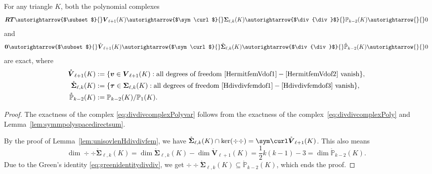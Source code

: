 \begin{lemma}
For any triangle $K$, both the polynomial complexes
\begin{equation}\label{eq:divdivcomplexPolyvar}
\boldsymbol  {RT}\autorightarrow{$\subset$}{} \boldsymbol V_{\ell+1}(K)\autorightarrow{$\sym\curl$}{} \boldsymbol \Sigma_{\ell,k}(K) \autorightarrow{$\div{\div}$}{} \mathbb P_{k-2}(K)\autorightarrow{}{}0
\end{equation}
and
\begin{equation}\label{eq:divdivcomplexPolyvar0}
\boldsymbol 0\autorightarrow{$\subset$}{} \mathring{\boldsymbol V}_{\ell+1}(K)\autorightarrow{$\sym\curl$}{} \mathring{\boldsymbol \Sigma}_{\ell,k}(K) \autorightarrow{$\div{\div}$}{} \mathring{\mathbb P}_{k-2}(K)\autorightarrow{}{}0
\end{equation}
are exact, where
\begin{align*}
\mathring{\boldsymbol V}_{\ell+1}(K)&:=\{\boldsymbol  v\in\boldsymbol V_{\ell+1}(K): \textrm{all degrees of freedom } \eqref{HermitfemVdof1}-\eqref{HermitfemVdof2} \textrm{ vanish}\},
\\
\mathring{\boldsymbol \Sigma}_{\ell,k}(K)&:=\{\boldsymbol  \tau\in\boldsymbol \Sigma_{\ell,k}(K): \textrm{all degrees of freedom } \eqref{Hdivdivfemdof1}-\eqref{Hdivdivfemdof3} \textrm{ vanish}\},
\\
\mathring{\mathbb P}_{k-2}(K)&:=\mathbb P_{k-2}(K)/\mathbb P_{1}(K).
\end{align*}
\end{lemma}
\begin{proof}
The exactness of the complex \eqref{eq:divdivcomplexPolyvar} follows from the exactness of the complex~\eqref{eq:divdivcomplexPoly} and Lemma~\ref{lem:symmpolyspacedirectsum}.

By the proof of Lemma~\ref{lem:unisovlenHdivdivfem}, we have $\mathring{\boldsymbol \Sigma}_{\ell,k}(K)\cap\ker(\div{\div})=\sym \curl\mathring{\boldsymbol V}_{\ell+1}(K)$. This also means
\[
\dim\div{\div}\mathring{\boldsymbol \Sigma}_{\ell,k}(K)=\dim\mathring{\boldsymbol \Sigma}_{\ell,k}(K)-\dim\mathring{\boldsymbol V}_{\ell+1}(K)=\frac{1}{2}k(k-1)-3=\dim\mathring{\mathbb P}_{k-2}(K).
\]
Due to the Green's identity \eqref{eq:greenidentitydivdiv}, we get $\div{\div}\mathring{\boldsymbol \Sigma}_{\ell,k}(K)\subseteq \mathring{\mathbb P}_{k-2}(K)$, which ends the proof.
\end{proof}

